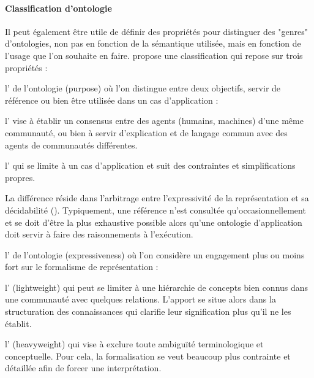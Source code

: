\paragraph{Classification d'ontologie}
Il peut également être utile de définir des propriétés pour distinguer des "genres" d'ontologies, non pas en fonction de la sémantique utilisée, mais en fonction de l'usage que l'on souhaite en faire. 
\cite{Oberle2006} propose une classification qui repose sur trois propriétés : 
\begin{listeni}
	\item l' de l'ontologie (purpose) où l'on distingue entre deux objectifs, servir de référence ou bien être utilisée dans un cas d'application :
	\begin{liste}
		\item l' vise à établir un consensus entre des agents (humains, machines) d'une même communauté, ou bien à servir d'explication et de langage commun avec des agents de communautés différentes. 
		\item l' qui se limite à un cas d'application et suit des contraintes et simplifications propres.
	\end{liste}
	La différence réside dans l'arbitrage entre l'expressivité de la représentation et sa décidabilité (\cite{Borgo2002}). 
	Typiquement, une référence n'est consultée qu'occasionnellement et se doit d'être la plus exhaustive possible alors qu'une ontologie d'application doit servir à faire des raisonnements à l'exécution. 

	\item l' de l'ontologie (expressiveness) où l'on considère un engagement plus ou moins fort sur le formalisme de représentation :
	\begin{liste}
		\item l' (lightweight) qui peut se limiter à une hiérarchie de concepts bien connus dans une communauté avec quelques relations. 
		L'apport se situe alors dans la structuration des connaissances qui clarifie leur signification plus qu'il ne les établit.
		\item l' (heavyweight) qui vise à exclure toute ambiguïté terminologique et conceptuelle.
		Pour cela, la formalisation se veut beaucoup plus contrainte et détaillée afin de forcer une interprétation. 
	\end{liste}


\end{listeni}
